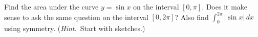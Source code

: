 Find the area under the curve $y=\sin x$ on the interval $[0,\pi]$.  Does it make sense to ask the same question on the interval $[0,2\pi]$?  Also find $\int_0^{2\pi} |\sin x|\,dx$ using symmetry.  (\emph{Hint.}~Start with sketches.)
